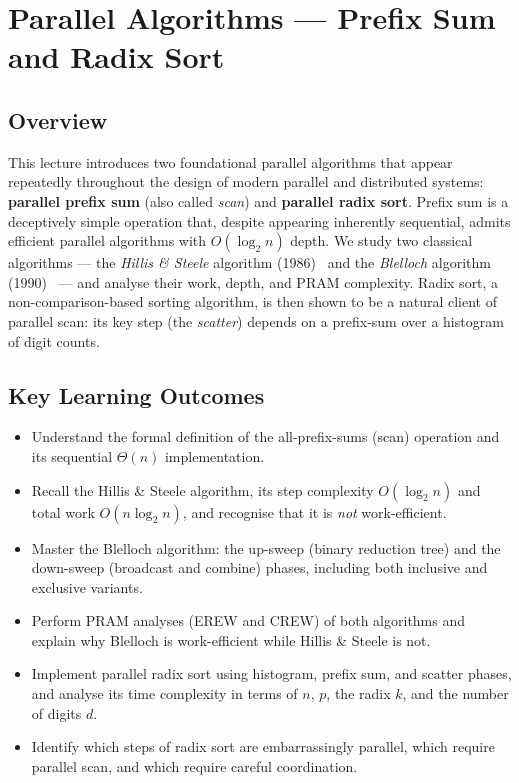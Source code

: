 
\chapter{Parallel Algorithms --- Prefix Sum and Radix Sort}

\section{Overview}
This lecture introduces two foundational parallel algorithms that appear
repeatedly throughout the design of modern parallel and distributed
systems: \textbf{parallel prefix sum} (also called \emph{scan}) and
\textbf{parallel radix sort}. Prefix sum is a deceptively simple operation
that, despite appearing inherently sequential, admits efficient parallel
algorithms with $O(\log_2 n)$ depth. We study two classical algorithms ---
the \emph{Hillis \& Steele} algorithm (1986)~\cite{hillis1986} and the \emph{Blelloch} algorithm
(1990)~\cite{blelloch1990} --- and analyse their work, depth, and PRAM complexity. Radix sort, a
non-comparison-based sorting algorithm, is then shown to be a natural client
of parallel scan: its key step (the \emph{scatter}) depends on a prefix-sum
over a histogram of digit counts.

\section{Key Learning Outcomes}
\begin{itemize}[leftmargin=*]
  \item Understand the formal definition of the all-prefix-sums (scan)
        operation and its sequential $\Theta(n)$ implementation.
  \item Recall the Hillis \& Steele algorithm, its step complexity
        $O(\log_2 n)$ and total work $O(n \log_2 n)$, and recognise that
        it is \emph{not} work-efficient.
  \item Master the Blelloch algorithm: the up-sweep (binary reduction tree)
        and the down-sweep (broadcast and combine) phases, including both
        inclusive and exclusive variants.
  \item Perform PRAM analyses (EREW and CREW) of both algorithms and
        explain why Blelloch is work-efficient while Hillis \& Steele is not.
  \item Implement parallel radix sort using histogram, prefix sum, and
        scatter phases, and analyse its time complexity in terms of $n$,
        $p$, the radix $k$, and the number of digits $d$.
  \item Identify which steps of radix sort are embarrassingly parallel,
        which require parallel scan, and which require careful coordination.
\end{itemize}

